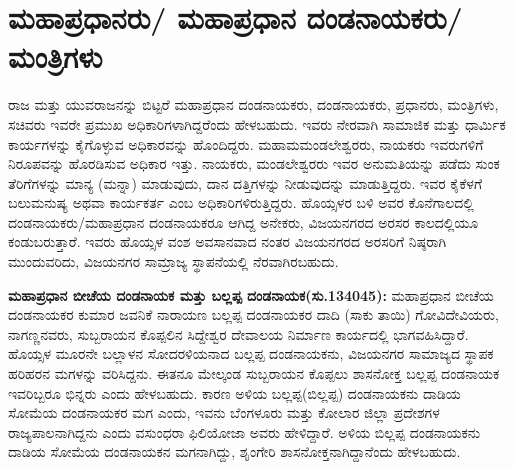 \section{ಮಹಾಪ್ರಧಾನರು/ ಮಹಾಪ್ರಧಾನ ದಂಡನಾಯಕರು/ಮಂತ್ರಿಗಳು}

ರಾಜ ಮತ್ತು ಯುವರಾಜನನ್ನು ಬಿಟ್ಟರೆ ಮಹಾಪ್ರಧಾನ ದಂಡನಾಯಕರು, ದಂಡನಾಯಕರು, ಪ್ರಧಾನರು, ಮಂತ್ರಿಗಳು, ಸಚಿವರು ಇವರೇ ಪ್ರಮುಖ ಅಧಿಕಾರಿಗಳಾಗಿದ್ದರೆಂದು ಹೇಳಬಹುದು. ಇವರು ನೇರವಾಗಿ ಸಾಮಾಜಿಕ ಮತ್ತು ಧಾರ್ಮಿಕ ಕಾರ್ಯಗಳನ್ನು ಕೈಗೊಳ್ಳುವ ಅಧಿಕಾರವನ್ನು ಹೊಂದಿದ್ದರು. ಮಹಾಮಮಂಡಲೇಶ್ವರರು, ನಾಯಕರು ಇವರುಗಳಿಗೆ ನಿರೂಪವನ್ನು ಹೊರಡಿಸುವ ಅಧಿಕಾರ ಇತ್ತು. ನಾಯಕರು, ಮಂಡಲೇಶ್ವರರು ಇವರ ಅನುಮತಿಯನ್ನು ಪಡೆದು ಸುಂಕ ತೆರಿಗೆ\-ಗಳನ್ನು ಮಾನ್ಯ (ಮನ್ನಾ) ಮಾಡುವುದು, ದಾನ ದತ್ತಿಗಳನ್ನು ನೀಡುವುದನ್ನು ಮಾಡುತ್ತಿದ್ದರು. ಇವರ ಕೈಕೆಳಗೆ ಬಲುಮನುಷ್ಯ ಅಥವಾ ಕಾರ್ಯಕರ್ತ ಎಂಬ ಅಧಿಕಾರಿಗಳಿರುತ್ತಿದ್ದರು. ಹೊಯ್ಸಳರ ಬಳಿ ಅವರ ಕೊನೆಗಾಲದಲ್ಲಿ ದಂಡನಾಯಕರು/\-ಮಹಾಪ್ರಧಾನ ದಂಡನಾಯಕರೂ ಆಗಿದ್ದ ಅನೇಕರು, ವಿಜಯನಗರದ ಅರಸರ ಕಾಲದಲ್ಲಿಯೂ ಕಂಡುಬರುತ್ತಾರೆ. ಇವರು ಹೊಯ್ಸಳ ವಂಶ ಅವಸಾನವಾದ ನಂತರ ವಿಜಯನಗರದ ಅರಸರಿಗೆ ನಿಷ್ಠರಾಗಿ ಮುಂದುವರಿದು, ವಿಜಯನಗರ ಸಾಮ್ರಾಜ್ಯ ಸ್ಥಾಪನೆಯಲ್ಲಿ ನೆರವಾಗಿರಬಹುದು.

\newpage

\textbf{ಮಹಾಪ್ರಧಾನ ಬೀಚೆಯ ದಂಡನಾಯಕ ಮತ್ತು ಬಲ್ಲಪ್ಪ ದಂಡನಾಯಕ(ಸು.1340\general{\enginline{-}}45):} ಮಹಾಪ್ರಧಾನ ಬೀಚೆಯ ದಂಡನಾಯಕರ ಕುಮಾರ ಜವನಿಕೆ ನಾರಾಯಣ ಬಲ್ಲಪ್ಪ ದಂಡನಾಯಕರ ದಾದಿ (ಸಾಕು ತಾಯಿ) ಗೋವಿದೇವಿಯರು, ನಾಗಣ್ಣನವರು, ಸುಬ್ಬರಾಯನ ಕೊಪ್ಪಲಿನ ಸಿದ್ದೇಶ್ವರ ದೇವಾಲಯ ನಿರ್ಮಾಣ ಕಾರ್ಯದಲ್ಲಿ ಭಾಗವಹಿಸಿದ್ದಾರೆ. ಹೊಯ್ಸಳ ಮೂರನೇ ಬಲ್ಲಾಳನ ಸೋದರಳಿಯನಾದ ಬಲ್ಲಪ್ಪ ದಂಡನಾಯಕನು, ವಿಜಯನಗರ ಸಾಮಾಜ್ಯದ ಸ್ಥಾಪಕ ಹರಿಹರನ ಮಗಳನ್ನು ವರಿಸಿದ್ದನು. ಈತನೂ ಮೇಲ್ಕಂಡ ಸುಬ್ಬರಾಯನ ಕೊಪ್ಪಲು ಶಾಸನೋಕ್ತ ಬಲ್ಲಪ್ಪ ದಂಡನಾಯಕ ಇವರಿಬ್ಬರೂ ಭಿನ್ನರು ಎಂದು ಹೇಳಬಹುದು. ಕಾರಣ ಅಳಿಯ ಬಲ್ಲಪ್ಪ(ಬಿಲ್ಲಪ್ಪ) ದಂಡನಾಯಕನು ದಾಡಿಯ ಸೋಮೆಯ ದಂಡನಾಯಕರ ಮಗ ಎಂದು, ಇವನು ಬೆಂಗಳೂರು ಮತ್ತು ಕೋಲಾರ ಜಿಲ್ಲಾ ಪ್ರದೇಶಗಳ ರಾಜ್ಯಪಾಲನಾಗಿದ್ದನು ಎಂದು ವಸುಂಧರಾ ಫಿಲಿಯೋಜಾ ಅವರು ಹೇಳಿದ್ದಾರೆ. ಅಳಿಯ ಬಿಲ್ಲಪ್ಪ ದಂಡನಾಯಕನು ದಾಡಿಯ ಸೋಮೆಯ ದಂಡನಾಯಕನ ಮಗನಾಗಿದ್ದು, ಶೃಂಗೇರಿ ಶಾಸನೋಕ್ತನಾಗಿದ್ದಾನೆಂದು ಹೇಳಬಹುದು.

\vskip 2pt

